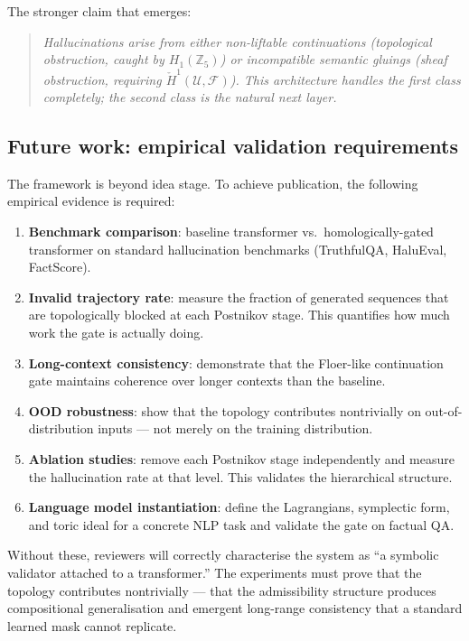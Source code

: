 \documentclass[11pt,a4paper]{article}
\begin{document}
The stronger claim that emerges:
\begin{quote}
\emph{Hallucinations arise from either non-liftable continuations
(topological obstruction, caught by $H_1(\mathbb{Z}_5)$) or
incompatible semantic gluings (sheaf obstruction, requiring
$\check{H}^1(\mathcal{U},\mathcal{F})$).
This architecture handles the first class completely;
the second class is the natural next layer.}
\end{quote}

\subsection*{Future work: empirical validation requirements}

The framework is beyond idea stage.
To achieve publication, the following empirical evidence is required:

\begin{enumerate}[label=(\roman*)]
  \item \textbf{Benchmark comparison}: baseline transformer vs.\
        homologically-gated transformer on standard hallucination
        benchmarks (TruthfulQA, HaluEval, FactScore).
  \item \textbf{Invalid trajectory rate}: measure the fraction of
        generated sequences that are topologically blocked at each
        Postnikov stage. This quantifies how much work the gate
        is actually doing.
  \item \textbf{Long-context consistency}: demonstrate that the
        Floer-like continuation gate maintains coherence over
        longer contexts than the baseline.
  \item \textbf{OOD robustness}: show that the topology
        contributes nontrivially on out-of-distribution inputs
        --- not merely on the training distribution.
  \item \textbf{Ablation studies}: remove each Postnikov stage
        independently and measure the hallucination rate at that
        level. This validates the hierarchical structure.
  \item \textbf{Language model instantiation}: define the
        Lagrangians, symplectic form, and toric ideal for a
        concrete NLP task and validate the gate on factual QA.
\end{enumerate}

\noindent
Without these, reviewers will correctly characterise the system as
``a symbolic validator attached to a transformer.''
The experiments must prove that the topology contributes
nontrivially --- that the admissibility structure produces
compositional generalisation and emergent long-range consistency
that a standard learned mask cannot replicate.
\end{document}
